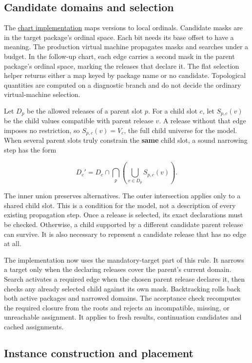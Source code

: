 \documentclass[
  11pt,
  letterpaper,
]{article}
\begin{document}
\subsection{Candidate domains and
selection}\label{candidate-domains-and-selection}

The \href{../../crates/jhol-core/src/jagr_infinite.rs}{chart
implementation} maps versions to local ordinals. Candidate masks are in
the target package's ordinal space. Each bit needs its base offset to
have a meaning. The production virtual machine propagates masks and
searches under a budget. In the follow-up chart, each edge carries a
second mask in the parent package's ordinal space, marking the releases
that declare it. The flat selection helper returns either a map keyed by
package name or no candidate. Topological quantities are computed on a
diagnostic branch and do not decide the ordinary virtual-machine
selection.

Let \(D_p\) be the allowed releases of a parent slot \(p\). For a child
slot \(c\), let \(S_{p,c}(v)\) be the child values compatible with
parent release \(v\). A release without that edge imposes no
restriction, so \(S_{p,c}(v)=V_c\), the full child universe for the
model. When several parent slots truly constrain the \textbf{same} child
slot, a sound narrowing step has the form

\[D_c' = D_c \cap \bigcap_p \left(\bigcup_{v\in D_p} S_{p,c}(v)\right).\]

The inner union preserves alternatives. The outer intersection applies
only to a shared child slot. This is a condition for the model, not a
description of every existing propagation step. Once a release is
selected, its exact declarations must be checked. Otherwise, a child
supported by a different candidate parent release can survive. It is
also necessary to represent a candidate release that has no edge at all.

The implementation now uses the mandatory-target part of this rule. It
narrows a target only when the declaring releases cover the parent's
current domain. Search activates a required edge when the chosen parent
release declares it, then checks any already selected child against its
own mask. Backtracking rolls back both active packages and narrowed
domains. The acceptance check recomputes the required closure from the
roots and rejects an incompatible, missing, or unreachable assignment.
It applies to fresh results, continuation candidates and cached
assignments.

\subsection{Instance construction and
placement}\label{instance-construction-and-placement}
\end{document}
